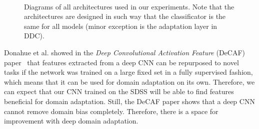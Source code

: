 \begin{figure}
\begin{center}
{\begin{tikzpicture}[node distance=1.5cm]
\end{tikzpicture}
\label{dann_architecture}
}\\
\end{center}
\caption[Experimental architectures of deep domain adaptation models]{
	Diagrams of all architectures used in our experiments.
	Note that the architectures are designed in such way
	that the classificator is the same for all models
	(minor exception is the adaptation layer in DDC).
	}
\end{figure}

Donahue et al. showed in the \textit{Deep Convolutional Activation Feature} (DeCAF) paper~\cite{donahue2014}
that features extracted from a deep CNN can be repurposed to novel tasks
if the network was trained on a large fixed set in a fully supervised fashion,
which means that it can be used for domain adaptation on its own.
Therefore, we can expect that our CNN trained on the SDSS
will be able to find features beneficial for domain adaptation.
Still, the DeCAF paper shows that a deep CNN cannot remove domain bias completely.
Therefore, there is a space for improvement with deep domain adaptation.

